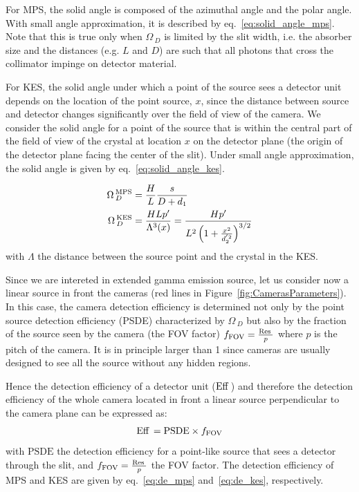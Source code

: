 \documentclass[a4paper,english,12pt]{article}
\begin{document}
For MPS, the solid angle is composed of the azimuthal angle and the polar angle. With small angle approximation, it is described by
eq.~\ref{eq:solid_angle_mps}. Note that this is true only when $\Omega\,_D$ is
limited by the slit width, i.e. the absorber size and the distances (e.g. $L$ and $D$) are such that
all photons that cross the collimator impinge on detector material. 

For KES, the solid angle under which a point of the source sees a detector unit depends on the location of the point source, $x$, since the distance between source and detector changes significantly over the field of view of the camera. We
consider the solid angle for a point of the source that is within the central
part of the field of view of the crystal at location $x$ on the detector plane
(the origin of the detector plane facing the center of the slit). Under small
angle approximation, the solid angle is given by eq.~\ref{eq:solid_angle_kes}.

\begin{align}  
  \Omega\,_D^{\textrm{MPS}} & = \frac{H}{L} \frac{s}{D+d_1} \label{eq:solid_angle_mps} \\
	\Omega\,_D^{\textrm{KES}} & = \frac{H L p'}{\Lambda^3(x)} =  \frac{H p'}{L^2 \left( 1+\frac{x^2}{d_2^{'2}} \right)^{3/2}} \label{eq:solid_angle_kes} 
\end{align}
with $\Lambda$ the distance between the source point and the crystal in the KES.


Since we are intereted in extended gamma emission source, let us consider now a linear source in front the cameras (red lines in Figure~\ref{fig:CamerasParameters}). In this case, the camera detection efficiency is determined not only by the point source detection efficiency (PSDE) characterized by $\Omega\,_D$ but also by the fraction of the source seen by the camera (the FOV factor) $f_{\textrm{FOV}} = \frac{\textrm{Res}\,_{}}{p}$ where $p$ is the pitch of the camera. It is in principle larger than 1 since cameras are usually designed to see all the source without any hidden regions.

Hence the detection efficiency of a detector unit ($\textrm{Eff}\,_{}$) and therefore the detection efficiency of the whole camera located in front a linear source perpendicular to  the camera plane can be expressed as:
\begin{align} 
	\textrm{Eff}\,_{} = \textrm{PSDE} \times f_{\textrm{FOV}}
\end{align}
with $\textrm{PSDE}$ the detection efficiency for a point-like source that sees a detector through the slit, and $f_{\textrm{FOV}} = \frac{\textrm{Res}\,_{}}{p}$ the FOV factor. The detection efficiency of MPS and KES are given by eq.~\ref{eq:de_mps} and~\ref{eq:de_kes}, respectively.
\end{document}
